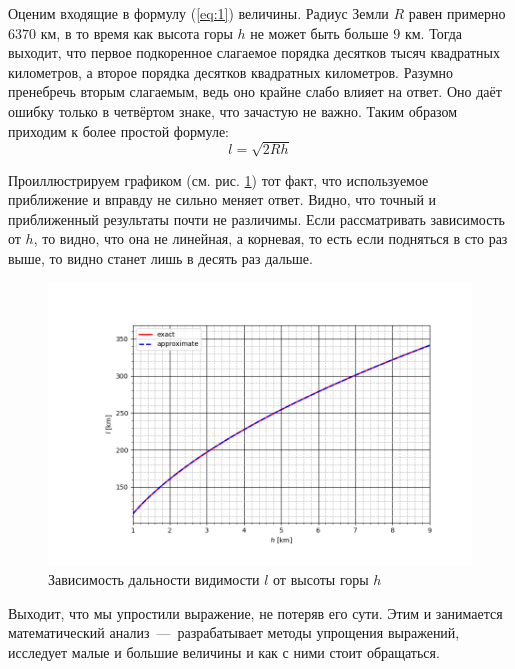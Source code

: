 \documentclass[titlepage]{article}
\begin{document}
\par
Оценим входящие в формулу (\ref{eq:1}) величины. Радиус Земли $R$ равен примерно $6 370$ км, в то время как высота горы $h$ не может быть больше $9$ км. Тогда выходит, что первое подкоренное слагаемое порядка десятков тысяч квадратных километров, а второе порядка десятков квадратных километров. Разумно пренебречь вторым слагаемым, ведь оно крайне слабо влияет на ответ. Оно даёт ошибку только в четвёртом знаке, что зачастую не важно. Таким образом приходим к более простой формуле:
\begin{equation}
 l = \sqrt{2Rh}
\end{equation}

Проиллюстрируем графиком (см. рис. \ref{fig:2}) тот факт, что используемое приближение и вправду не сильно меняет ответ. Видно, что точный и приближенный результаты почти не различимы. Если рассматривать зависимость от $h$, то видно, что она не линейная, а корневая, то есть если подняться в сто раз выше, то видно станет лишь в десять раз дальше.

\begin{figure}[htb]
 \centering
 \includegraphics[width=130mm]{1.png}
 \caption{Зависимость дальности видимости $l$ от высоты горы $h$}
 \label{fig:2}
\end{figure}

\par
Выходит, что мы упростили выражение, не потеряв его сути. Этим и занимается математический анализ~\----~разрабатывает методы упрощения выражений, исследует малые и большие величины и как с ними стоит обращаться.
\end{document}
